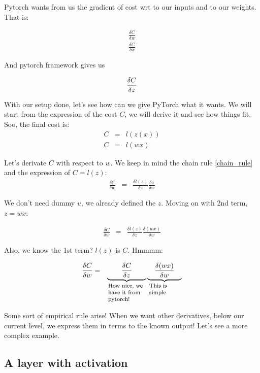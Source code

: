 \documentclass{article}
\newcommand{\explain}[2]{\underbrace{{#1}}_{\parbox{\widthof{\ensuremath{#1}}}{\footnotesize\raggedright #2}}}
\begin{document}
Pytorch wants from us the gradient of cost wrt to our inputs and to our weights. That is: 

\begin{eqnarray}
	\frac{\delta C}{\delta w} \\
 	\frac{\delta C}{\delta x}
\end{eqnarray}

And pytorch framework gives us 

\begin{equation}
	\frac{\delta C}{\delta z} \\
\end{equation}

With our setup done, let's see how can we give PyTorch what it wants. We will start from the expression of the cost $C$, we will derive it and see how things fit. Soo, the final cost is:
\begin{eqnarray}
	C&=&l(z(x))\\
	C&=&l(w x)
\end{eqnarray}

Let's derivate $C$ with respect to $w$. We keep in mind the chain rule \eqref{chain_rule} and the expression of  $C = l(z)$:
\begin{eqnarray}
	\frac{\delta C}{\delta w}&=&\frac{\delta l(z)}{\delta z}\frac{\delta z}{\delta w}
\end{eqnarray}

We don't need dummy $u$, we already defined the $z$. Moving on with 2nd term, $z =  w x$:

\begin{eqnarray}
	\frac{\delta C}{\delta w}&=&\frac{\delta l(z)}{\delta z}\frac{\delta (w x)}{\delta w}
\end{eqnarray}

Also, we know the 1st term? $l(z)$ is $C$. Hmmmm:

\begin{eqnarray}
	\frac{\delta C}{\delta w}&=&\explain{\qquad\frac{\delta C}{\delta z}\qquad}{How nice, we have it from pytorch!}\explain{\quad\frac{\delta (w x)}{\delta w}\quad}{This is simple}
\end{eqnarray}

Some sort of empirical rule arise! When we want other derivatives, below our current level, we express them in terms to the known output! Let's see a more complex example.

\subsection{A layer with activation}
\end{document}
